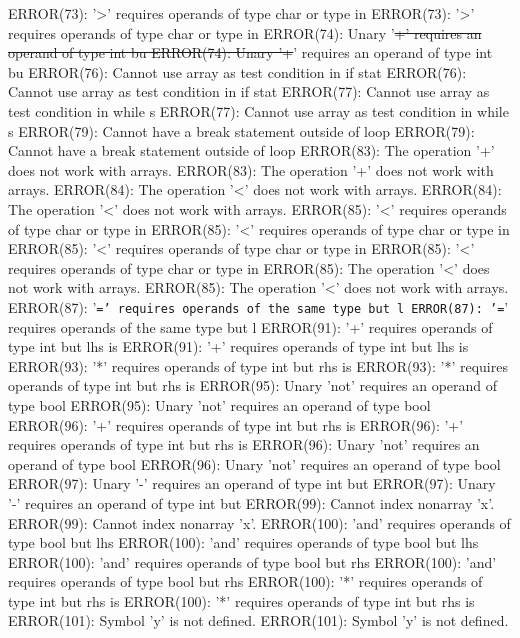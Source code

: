 \documentclass[12pt]{book}
\begin{document}
ERROR(73): '>' requires operands of type char or type in        ERROR(73): '>' requires operands of type char or type in
ERROR(74): Unary '\sout{+' requires an operand of type int bu        ERROR(74): Unary '+}' requires an operand of type int bu
ERROR(76): Cannot use array as test condition in if stat        ERROR(76): Cannot use array as test condition in if stat
ERROR(77): Cannot use array as test condition in while s        ERROR(77): Cannot use array as test condition in while s
ERROR(79): Cannot have a break statement outside of loop        ERROR(79): Cannot have a break statement outside of loop
ERROR(83): The operation '+' does not work with arrays.                ERROR(83): The operation '+' does not work with arrays.
ERROR(84): The operation '<' does not work with arrays.                ERROR(84): The operation '<' does not work with arrays.
ERROR(85): '<' requires operands of type char or type in        ERROR(85): '<' requires operands of type char or type in
ERROR(85): '<' requires operands of type char or type in        ERROR(85): '<' requires operands of type char or type in
ERROR(85): The operation '<' does not work with arrays.                ERROR(85): The operation '<' does not work with arrays.
ERROR(87): '\texttt{=' requires operands of the same type but l	ERROR(87): '=}' requires operands of the same type but l
ERROR(91): '+' requires operands of type int but lhs is         ERROR(91): '+' requires operands of type int but lhs is 
ERROR(93): '*' requires operands of type int but rhs is         ERROR(93): '*' requires operands of type int but rhs is 
ERROR(95): Unary 'not' requires an operand of type bool         ERROR(95): Unary 'not' requires an operand of type bool 
ERROR(96): '+' requires operands of type int but rhs is         ERROR(96): '+' requires operands of type int but rhs is 
ERROR(96): Unary 'not' requires an operand of type bool         ERROR(96): Unary 'not' requires an operand of type bool 
ERROR(97): Unary '-' requires an operand of type int but        ERROR(97): Unary '-' requires an operand of type int but
ERROR(99): Cannot index nonarray 'x'.                                ERROR(99): Cannot index nonarray 'x'.
ERROR(100): 'and' requires operands of type bool but lhs        ERROR(100): 'and' requires operands of type bool but lhs
ERROR(100): 'and' requires operands of type bool but rhs        ERROR(100): 'and' requires operands of type bool but rhs
ERROR(100): '*' requires operands of type int but rhs is        ERROR(100): '*' requires operands of type int but rhs is
ERROR(101): Symbol 'y' is not defined.                                ERROR(101): Symbol 'y' is not defined.
\end{document}
